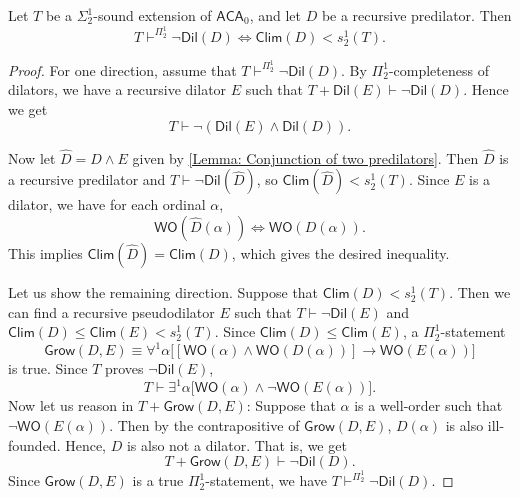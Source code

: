 \documentclass{mhkr}
\newcommand{\added}[1]{#1}
\newcommand{\WO}{\mathsf{WO}}
\newcommand{\Clim}{\mathsf{Clim}}
\newcommand{\Grow}{\mathsf{Grow}}
\newcommand{\Dil}{\mathsf{Dil}}
\newcommand{\ACA}{\mathsf{ACA}}
\begin{document}
\begin{lemma} \label{Lemma: When the climax happens before s12 ordinal of a theory}
    Let $T$ be a $\Sigma^1_2$-sound extension of $\ACA_0$, and let $D$ be a recursive predilator.
    Then
    \begin{equation*}
        T\vdash^{\Pi^1_2} \lnot\Dil(D)\iff \Clim(D)<s^1_2(T).
    \end{equation*} 
\end{lemma}
\begin{proof}
    For one direction, assume that $T\vdash^{\Pi^1_2} \lnot\Dil(D)$. By $\Pi^1_2$-completeness of dilators, we have a recursive dilator $E$ such that $T + \Dil(E) \vdash \lnot\Dil(D)$.
    Hence we get
    \begin{equation*}
        T\vdash\lnot(\Dil(E)\land\Dil(D)).
    \end{equation*}
    
    Now let $\hat{D}=D\land E$ given by \autoref{Lemma: Conjunction of two predilators}.
    Then $\hat{D}$ is a recursive predilator and $T\vdash \lnot\Dil(\hat{D})$, so $\Clim(\hat{D})<s^1_2(T)$. 
    Since $E$ is a dilator, we have for each ordinal $\alpha$,
    \begin{equation*}
        \WO(\hat{D}(\alpha))\iff\WO(D(\alpha)).
    \end{equation*}
    This implies $\Clim(\hat{D})=\Clim(D)$, which gives the desired inequality.

    Let us show the remaining direction. Suppose that $\Clim(D)< s^1_2(T)$. Then we can find a recursive pseudodilator $E$ such that $T\vdash\lnot \Dil(E)$ and $\Clim(D)\le \Clim(E) < s^1_2(T)$. 
    Since $\Clim(D)\le \Clim(E)$, a $\Pi^1_2$-statement
    \begin{equation*}
        \Grow(D,E)\equiv \forall^1\alpha \bigl[[\WO(\alpha)\land\WO(D(\alpha))]\to \WO(E(\alpha))\bigr]
    \end{equation*}
    is true. Since $T$ proves $\lnot\Dil(E)$,
    \begin{equation*}
        T  \vdash \exists^1 \alpha \bigl[\WO(\alpha) \land \lnot\WO(E(\alpha))\bigr].
    \end{equation*}
    Now let us reason in $T + \Grow(D,E)$: Suppose that $\alpha$ is a well-order such that \added{$\lnot\WO(E(\alpha))$}. Then by the contrapositive of $\Grow(D,E)$, $D(\alpha)$ is also ill-founded. Hence, $D$ is also not a dilator. That is, we get
    \begin{equation*}
        T +\Grow(D,E) \vdash \lnot\Dil(D).
    \end{equation*}
    Since $\Grow(D,E)$ is a true $\Pi^1_2$-statement, we have $T\vdash^{\Pi^1_2}\lnot\Dil(D)$.
\end{proof}
\end{document}
